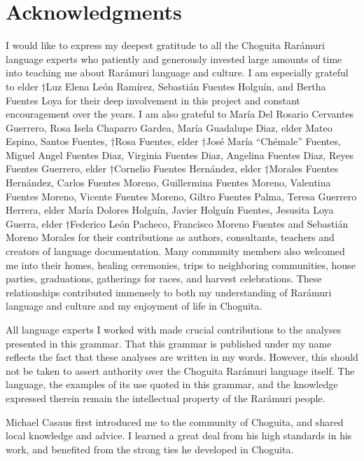 \chapter{Acknowledgments}

I would like to express my deepest gratitude to all the Choguita Rarámuri language experts who patiently and generously invested large amounts of time into teaching me about Rarámuri language and culture. I am especially grateful to elder †Luz Elena León Ramírez, Sebastián Fuentes Holguín, and Bertha Fuentes Loya for their deep involvement in this project and constant encouragement over the years. I am also grateful to María Del Rosario Cervantes Guerrero, Rosa Isela Chaparro Gardea, María Guadalupe Diaz, elder Mateo Espino, Santos Fuentes, †Rosa Fuentes, elder †José María “Chémale” Fuentes, Miguel Angel Fuentes Diaz, Virginia Fuentes Diaz, Angelina Fuentes Diaz, Reyes Fuentes Guerrero, elder †Cornelio Fuentes Hernández, elder †Morales Fuentes Hernández, Carlos Fuentes Moreno, Guillermina Fuentes Moreno, Valentina Fuentes Moreno, Vicente Fuentes Moreno, Giltro Fuentes Palma, Teresa Guerrero Herrera, elder María Dolores Holguín, Javier Holguín Fuentes, Jesusita Loya Guerra, elder †Federico León Pacheco, Francisco Moreno Fuentes and Sebastián Moreno Morales for their contributions as authors, consultants, teachers and creators of language documentation. Many community members also welcomed me into their homes, healing ceremonies, trips to neighboring communities, house parties, graduations, gatherings for races, and harvest celebrations. These relationships contributed immensely to both my understanding of Rarámuri language and culture and my enjoyment of life in Choguita.

All language experts I worked with made crucial contributions to the analyses presented in this grammar.  That this grammar is published under my name reflects the fact that these analyses are written in my words. However, this should not be taken to assert authority over the Choguita Rarámuri language itself. The language, the examples of its use quoted in this grammar, and the knowledge expressed therein remain the intellectual property of the Rarámuri people.

Michael Casaus first introduced me to the community of Choguita, and shared local knowledge and advice. I learned a great deal from his high standards in his work, and benefited from the strong ties he developed in Choguita.

